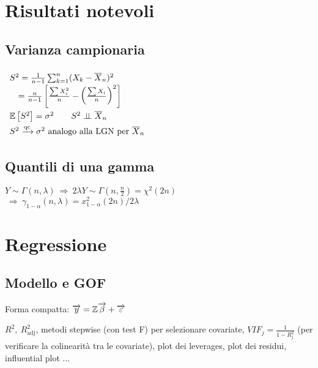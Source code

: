 \section{Risultati notevoli}


\subsection{Varianza campionaria}

${\renewcommand*{\arraystretch}{1.5}\begin{array}{l}
S^2 =\frac{1}{n-1}\sum^n_{k=1}( X_k -\overline{X}_n)^2 \\
\quad=\frac{n}{n-1}\left[\frac{\sum X_i^2}{n}-\left(\frac{\sum X_i}{n}\right)^2\right] \\
\EE\left[ S^2\right] =\sigma^2 \qquad S^2\Bot\Xn \\
S^2\xrightarrow{\text{qc}} \sigma^2\text{ analogo alla LGN per }\Xn \\
\end{array}}$

\subsection{Quantili di una gamma}

$Y\sim\Gamma(n,\lambda)\ \Rightarrow\ 2\lambda Y\sim\Gamma(n,\frac{n}{2})=\chi^2(2n)$ \\
$\text{}\ \Rightarrow\ \gamma_{1-\alpha}(n,\lambda)=x^2_{1-\alpha}(2n)/2\lambda$


\section{Regressione}


\subsection{Modello e GOF}

Forma compatta: $\overrightarrow{y}=\mathbb{Z}\overrightarrow{\beta}+\overrightarrow{\varepsilon}$

$R^2,\ R^2_{\text{adj}}$, metodi stepwise (con test F) per selezionare covariate, $VIF_j=\frac{1}{1-R^2_j}$ (per verificare la colinearità tra le covariate), plot dei leverages, plot dei residui, influential plot ...

